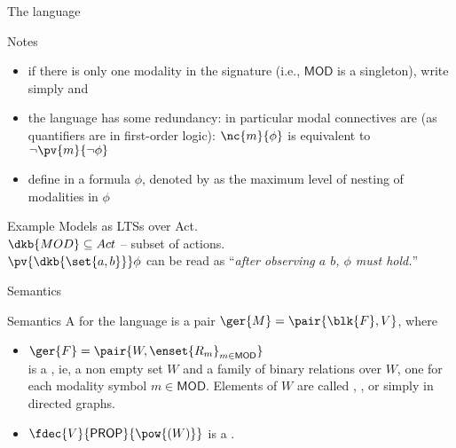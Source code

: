\documentclass{beamer}
\begin{document}
\begin{slide}{The language}\label{s:11}
\small
\begin{block}{Notes}
\begin{itemize}
\item if there is only one modality in the signature (i.e., $\mathsf{MOD}$ is a singleton), write simply \dgold{$\eventual \phi$} and \dgold{$\always \phi$}
\item the language has some redundancy: in particular modal connectives are  (as quantifiers are in first-order logic):
$\nc{m}{\phi}$ is equivalent to  $\neg \pv{m}{\neg \phi}$
\item define  in a formula $\phi$, denoted by \dgold{$\mdepth{\phi}$} as the maximum level of nesting of modalities in $\phi$
\end{itemize}
\end{block}

\begin{exampleblock}{Example}
  Models as LTSs over Act.\\
  $\dkb{MOD} \subseteq Act$ -- subset of actions.\\
  $\pv{\dkb{\set{a,b}}} \phi$ can be read as ``\emph{after observing $a$  $b$, $\phi$ must hold.}''
\end{exampleblock}

\end{slide}

\begin{slide}{Semantics}\label{s:12}
\small
\begin{block}{Semantics}
A  for the language is a pair $\ger{M} = \pair{\blk{F},V}$, where
\begin{itemize}
\item $\ger{F} = \pair{W, \enset{R_m}_{m \in \mathsf{MOD}}}$  \\ is a , ie, a non empty set $W$ and a family of binary relations
over $W$, one for each modality symbol $m \in \mathsf{MOD}$. Elements of $W$ are called ,  ,   or
simply   in  directed graphs. 
\item $\fdec{V}{\mathsf{PROP}}{\pow{(W)}}$ is a .
\end{itemize}
\end{block}
\end{slide}
\end{document}
